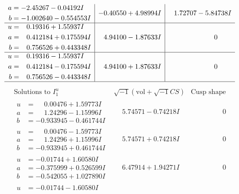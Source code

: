 \documentclass[1p]{elsarticle_modified}
\theoremstyle{definition}
\newcommand{\I}{\sqrt{-1}}
\begin{document}
$$\begin{array}{c|c|c}
\begin{aligned}
a &= -2.45267 - 0.04192 I \\
b &= -1.002640 - 0.554553 I\end{aligned}
 & -0.40550 + 4.98994 I & \phantom{-}1.72707 - 5.84738 I \\ \hline\begin{aligned}
u &= \phantom{-}0.19316 + 1.55937 I \\
a &= \phantom{-}0.412184 + 0.175594 I \\
b &= \phantom{-}0.756526 + 0.443348 I\end{aligned}
 & \phantom{-}4.94100 - 1.87633 I & \phantom{-0.000000 } 0 \\ \hline\begin{aligned}
u &= \phantom{-}0.19316 - 1.55937 I \\
a &= \phantom{-}0.412184 - 0.175594 I \\
b &= \phantom{-}0.756526 - 0.443348 I\end{aligned}
 & \phantom{-}4.94100 + 1.87633 I & \phantom{-0.000000 } 0\\
 \hline 
 \end{array}$$\newpage$$\begin{array}{c|c|c}  
\text{Solutions to }I^u_{1}& \I (\text{vol} + \sqrt{-1}CS) & \text{Cusp shape}\\
 \hline 
\begin{aligned}
u &= \phantom{-}0.00476 + 1.59773 I \\
a &= \phantom{-}1.24296 - 1.15996 I \\
b &= -0.933945 - 0.461744 I\end{aligned}
 & \phantom{-}5.74571 - 0.74218 I & \phantom{-0.000000 } 0 \\ \hline\begin{aligned}
u &= \phantom{-}0.00476 - 1.59773 I \\
a &= \phantom{-}1.24296 + 1.15996 I \\
b &= -0.933945 + 0.461744 I\end{aligned}
 & \phantom{-}5.74571 + 0.74218 I & \phantom{-0.000000 } 0 \\ \hline\begin{aligned}
u &= -0.01744 + 1.60580 I \\
a &= -0.375999 + 0.526599 I \\
b &= -0.542055 + 1.027890 I\end{aligned}
 & \phantom{-}6.47914 + 1.94271 I & \phantom{-0.000000 } 0 \\ \hline\begin{aligned}
u &= -0.01744 - 1.60580 I \\

\end{aligned}
\end{array}$$
\end{document}
